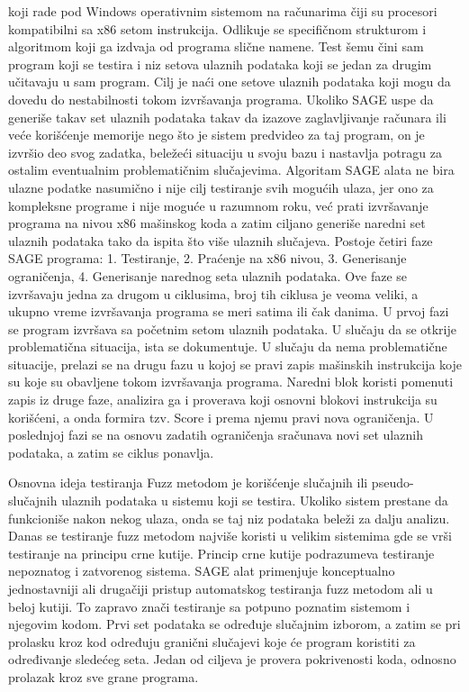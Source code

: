 \documentclass[12pt,oneside]{memoir}
\begin{document}
koji rade pod Windows operativnim sistemom na računarima čiji su procesori kompatibilni sa x86 setom instrukcija. Odlikuje se specifičnom strukturom i algoritmom koji ga izdvaja od programa slične namene. Test šemu čini sam program koji se testira i niz setova ulaznih podataka koji se jedan za drugim učitavaju u sam program. Cilj je naći one setove ulaznih podataka koji mogu da dovedu do nestabilnosti tokom izvršavanja programa. Ukoliko SAGE uspe da generiše takav set ulaznih podataka takav da izazove zaglavljivanje računara ili veće korišćenje memorije nego što je sistem predvideo za taj program, on je izvršio deo svog zadatka, beležeći situaciju u svoju bazu i nastavlja potragu za ostalim eventualnim problematičnim slučajevima. Algoritam SAGE alata ne bira ulazne podatke nasumično i nije cilj testiranje svih mogućih ulaza, jer ono za kompleksne programe i nije moguće u razumnom roku, već prati izvršavanje programa na nivou x86 mašinskog koda a zatim ciljano generiše naredni set ulaznih podataka tako da ispita što više ulaznih slučajeva. Postoje četiri faze SAGE programa: 1. Testiranje, 2. Praćenje na x86 nivou, 3. Generisanje ograničenja, 4. Generisanje narednog seta ulaznih podataka. Ove faze se izvršavaju jedna za drugom u ciklusima, broj tih ciklusa je veoma veliki, a ukupno vreme izvršavanja programa se meri satima ili čak danima. U prvoj fazi se program izvršava sa početnim setom ulaznih podataka. U slučaju da se otkrije problematična situacija, ista se dokumentuje. U slučaju da nema problematične situacije, prelazi se na drugu fazu u kojoj se pravi zapis mašinskih instrukcija koje su koje su obavljene tokom izvršavanja programa. Naredni blok koristi pomenuti zapis iz druge faze, analizira ga i proverava koji osnovni blokovi instrukcija su korišćeni, a onda formira tzv. Score i prema njemu pravi nova ograničenja. U poslednjoj fazi se na osnovu zadatih ograničenja sračunava novi set ulaznih podataka, a zatim se ciklus ponavlja. \par 
Osnovna ideja testiranja Fuzz metodom je korišćenje slučajnih ili pseudo-slučajnih  ulaznih podataka u sistemu koji se testira. Ukoliko sistem prestane da funkcioniše nakon nekog ulaza, onda se taj niz podataka beleži za dalju analizu. Danas se testiranje fuzz metodom najviše koristi u velikim sistemima gde se vrši testiranje na principu crne kutije. Princip crne kutije podrazumeva testiranje nepoznatog i zatvorenog sistema. SAGE alat primenjuje konceptualno jednostavniji ali drugačiji pristup automatskog testiranja fuzz metodom ali u beloj kutiji. To zapravo znači testiranje sa potpuno poznatim sistemom i njegovim kodom. Prvi set podataka se određuje slučajnim izborom, a zatim se pri prolasku kroz kod određuju granični slučajevi koje će program koristiti za određivanje sledećeg seta. Jedan od ciljeva je provera pokrivenosti koda, odnosno prolazak kroz sve grane programa.  \\ \\
\end{document}
